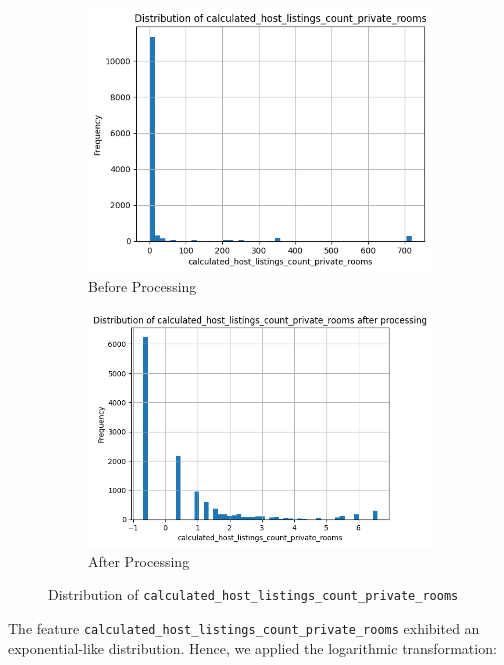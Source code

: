 \documentclass[12pt]{article}
\begin{document}
\begin{figure}[H]
\centering
\begin{subfigure}[b]{0.48\textwidth}
    \includegraphics[width=\textwidth]{images/private_rooms_before.png}
    \caption{Before Processing}
    \label{fig:hlcpr_before}
\end{subfigure}
\hfill
\begin{subfigure}[b]{0.48\textwidth}
    \includegraphics[width=\textwidth]{images/private_rooms_after.png}
    \caption{After Processing}
    \label{fig:hlcpr_after}
\end{subfigure}
\caption{Distribution of \texttt{calculated\_host\_listings\_count\_private\_rooms}}
\end{figure}

The feature \texttt{calculated\_host\_listings\_count\_private\_rooms} exhibited an exponential-like distribution. Hence, we applied the logarithmic transformation:
\end{document}
